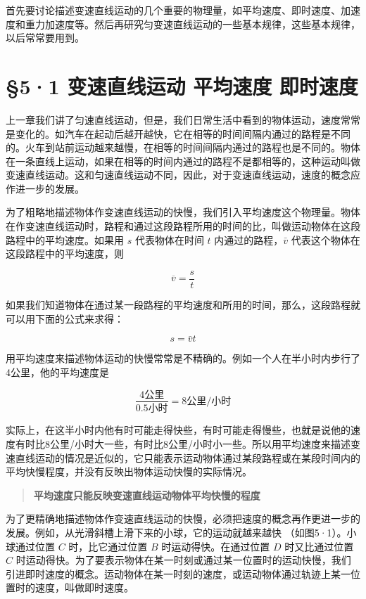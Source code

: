 首先要讨论描述变速直线运动的几个重要的物理量，如平均速度、即时速度、加速度和重力加速度等。然后再研究匀变速直线运动的一些基本规律，这些基本规律，以后常常要用到。

\section{§5·1 变速直线运动 平均速度
即时速度}\label{ux53d8ux901fux76f4ux7ebfux8fd0ux52a8-ux5e73ux5747ux901fux5ea6-ux5373ux65f6ux901fux5ea6}

上一章我们讲了匀速直线运动，但是，我们日常生活中看到的物体运动，速度常常是变化的。如汽车在起动后越开越快，它在相等的时间间隔内通过的路程是不同的。火车到站前运动越来越慢，在相等的时间间隔内通过的路程也是不同的。物体在一条直线上运动，如果在相等的时间内通过的路程不是都相等的，这种运动叫做变速直线运动。这和匀速直线运动不同，因此，对于变速直线运动，速度的概念应作进一步的发展。

为了粗略地描述物体作变速直线运动的快慢，我们引入平均速度这个物理量。物体在作变速直线运动时，路程和通过这段路程所用的时间的比，叫做运动物体在这段路程中的平均速度。如果用
\(s\) 代表物体在时间 \(t\) 内通过的路程，\(\bar{v}\)
代表这个物体在这段路程中的平均速度，则

\[
\overline {{v}} = \frac {s}{t} \tag{5.1}
\]

如果我们知道物体在通过某一段路程的平均速度和所用的时间，那么，这段路程就可以用下面的公式来求得：

\[
s = \bar {v} t \tag{5.2}
\]

用平均速度来描述物体运动的快慢常常是不精确的。例如一个人在半小时内步行了4公里，他的平均速度是

\[
\frac {4 \text{公里}}{0.5 \text{小时}} = 8 \text{公里/小时}
\]

实际上，在这半小时内他有时可能走得快些，有时可能走得慢些，也就是说他的速度有时比8公里/小时大一些，有时比8公里/小时小一些。所以用平均速度来描述变速直线运动的情况是近似的，它只能表示运动物体通过某段路程或在某段时间内的平均快慢程度，并没有反映出物体运动快慢的实际情况。

\begin{quote}
\textbf{平均速度只能反映变速直线运动物体平均快慢的程度}
\end{quote}

为了更精确地描述物体作变速直线运动的快慢，必须把速度的概念再作更进一步的发展。例如，从光滑斜槽上滑下来的小球，它的运动就越来越快
（如图5·1）。小球通过位置 \(C\) 时，比它通过位置 \(B\)
时运动得快。在通过位置 \(D\) 时又比通过位置 \(C\)
时运动得快。为了要表示物体在某一时刻或通过某一位置时的运动快慢，我们引进即时速度的概念。运动物体在某一时刻的速度，或运动物体通过轨迹上某一位置时的速度，叫做即时速度。

